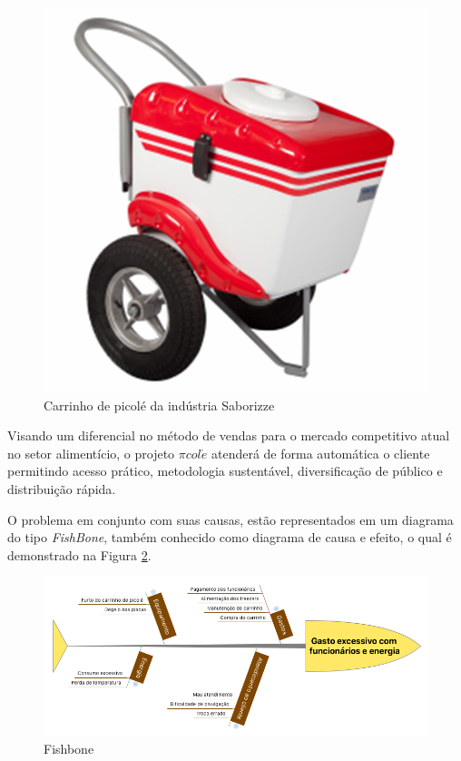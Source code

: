 \begin{figure}[htb]
	\centering
    \includegraphics[scale=0.3]{figuras/carrinho}
    \caption{Carrinho de picolé da indústria Saborizze}
    \label{fig:carrinho}
\end{figure}


Visando um diferencial no método de vendas para o mercado competitivo atual no setor alimentício, o projeto $\pi col\acute{e}$ atenderá de forma automática o cliente permitindo acesso prático, metodologia sustentável, diversificação de público e distribuição rápida.

O problema em conjunto com suas causas, estão representados em um diagrama do tipo \textit{FishBone}, também conhecido como diagrama de causa e efeito, o qual é demonstrado na Figura \ref{fig:fishbone}. 

\begin{figure}[htb]
	\centering
    \includegraphics[keepaspectratio=true,scale=0.4]{figuras/fishbone}
    \caption{Fishbone}
    \label{fig:fishbone}
\end{figure}


